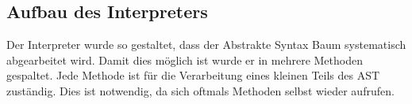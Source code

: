 
\subsection{Aufbau des Interpreters}
Der Interpreter wurde so gestaltet, dass der Abstrakte Syntax Baum systematisch abgearbeitet wird. Damit dies möglich ist wurde er in mehrere Methoden gespaltet. Jede Methode ist für die Verarbeitung eines kleinen Teils des AST zuständig. Dies ist notwendig, da sich oftmals Methoden selbst wieder aufrufen.

